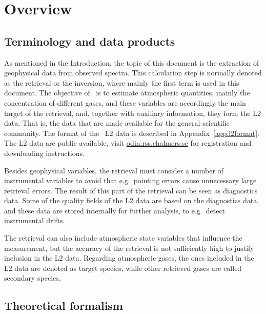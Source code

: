 \chapter{Overview}
\label{chapter:overview}


\section{Terminology and data products}
\label{sec:terminology}
%
As mentioned in the Introduction, the topic of this document is the extraction
of geophysical data from observed spectra. This calculation step is normally
denoted as the retrieval or the inversion, where mainly the first term is used
in this document. The objective of \smr\ is to estimate atmospheric quantities,
mainly the concentration of different gases, and these variables are
accordingly the main target of the retrieval, and, together with auxiliary
information, they form the L2 data. That is, the data that are made available
for the general scientific community. The format of the \smr\ L2 data is
described in Appendix~\ref{app:l2format}. The L2 data are public available,
visit \url{odin.rss.chalmers.se} for registration and downloading instructions.

Besides geophysical variables, the retrieval must consider a number of
instrumental variables to avoid that e.g.\ pointing errors cause unnecessary
large retrieval errors. The result of this part of the retrieval can be seen as
diagnostics data. Some of the quality fields of the L2 data are based on the
diagnostics data, and these data are stored internally for further analysis, to
e.g.\ detect instrumental drifts. 

The retrieval can also include atmospheric state variables that influence the
measurement, but the accuracy of the retrieval is not sufficiently high to
justify inclusion in the L2 data. Regarding atmospheric gases, the ones
included in the L2 data are denoted as target species, while other retrieved
gases are called secondary species.



\section{Theoretical formalism}
\label{sec:formalism}

